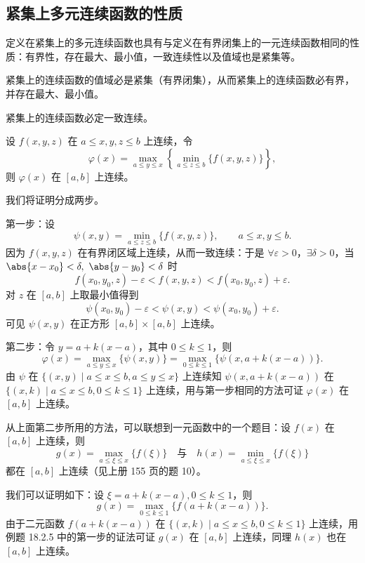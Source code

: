 \subsection{紧集上多元连续函数的性质}

定义在紧集上的多元连续函数也具有与定义在有界闭集上的一元连续函数相同的性质：有界性，存在最大、最小值，一致连续性以及值域也是紧集等。

\begin{xproposition}[18.2.2]
紧集上的连续函数的值域必是紧集（有界闭集），从而紧集上的连续函数必有界，并存在最大、最小值。
\end{xproposition}

\begin{xproposition}[18.2.3（Cantor 定理）]
紧集上的连续函数必定一致连续。
\end{xproposition}

\begin{xexample}[18.2.5]
设 $f(x,y,z)$ 在 $a\le x,y,z\le b$ 上连续，令
\[
  \varphi(x)=\max_{a\le y\le x}\left\{\min_{a\le z\le b}\{f(x,y,z)\}\right\},
\]
则 $\varphi(x)$ 在 $[a,b]$ 上连续。
\end{xexample}
\begin{xproof}
我们将证明分成两步。

第一步：设
\[
  \psi(x,y)=\min_{a\le z\le b}\{f(x,y,z)\},\qquad a\le x,y\le b.
\]
因为 $f(x,y,z)$ 在有界闭区域上连续，从而一致连续：于是 $\forall\varepsilon>0$，$\exists\delta>0$，当 $\abs{x-x_0}<\delta,\ \abs{y-y_0}<\delta$ 时
\[
  f(x_0,y_0,z)-\varepsilon<f(x,y,z)<f(x_0,y_0,z)+\varepsilon.
\]
对 $z$ 在 $[a,b]$ 上取最小值得到
\[
  \psi(x_0,y_0)-\varepsilon<\psi(x,y)<\psi(x_0,y_0)+\varepsilon.
\]
可见 $\psi(x,y)$ 在正方形 $[a,b]\times[a,b]$ 上连续。

第二步：令 $y=a+k(x-a)$，其中 $0\le k\le1$，则
\[
  \varphi(x)=\max_{a\le y\le x}\{\psi(x,y)\}
  =\max_{0\le k\le1}\{\psi(x,a+k(x-a))\}.
\]
由 $\psi$ 在 $\{(x,y)\mid a\le x\le b,a\le y\le x\}$ 上连续知 $\psi(x,a+k(x-a))$ 在 $\{(x,k)\mid a\le x\le b,0\le k\le1\}$ 上连续，用与第一步相同的方法可证 $\varphi(x)$ 在 $[a,b]$ 上连续。
\end{xproof}
\begin{xremark}
从上面第二步所用的方法，可以联想到一元函数中的一个题目：设 $f(x)$ 在 $[a,b]$ 上连续，则
\[
  g(x)=\max_{a\le\xi\le x}\{f(\xi)\}
  \quad\text{与}\quad
  h(x)=\min_{a\le\xi\le x}\{f(\xi)\}
\]
都在 $[a,b]$ 上连续（见上册 155 页的题 10）。

我们可以证明如下：设 $\xi=a+k(x-a),0\le k\le1$，则
\[
  g(x)=\max_{0\le k\le1}\{f(a+k(x-a))\}.
\]
由于二元函数 $f(a+k(x-a))$ 在 $\{(x,k)\mid a\le x\le b,0\le k\le1\}$ 上连续，用例题 18.2.5 中的第一步的证法可证 $g(x)$ 在 $[a,b]$ 上连续，同理 $h(x)$ 也在 $[a,b]$ 上连续。
\end{xremark}

